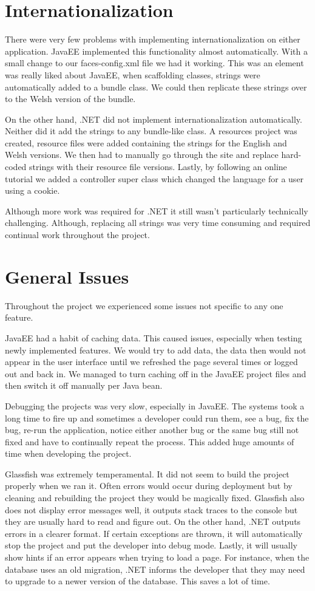 \section{Internationalization}
There were very few problems with implementing internationalization on either application. JavaEE implemented this functionality almost automatically. With a small change to our faces-config.xml file we had it working. This was an element was really liked about JavaEE, when scaffolding classes, strings were automatically added to a bundle class. We could then replicate these strings over to the Welsh version of the bundle. \par
On the other hand, .NET did not implement internationalization automatically. Neither did it add the strings to any bundle-like class. A resources project was created, resource files were added containing the strings for the English and Welsh versions. We then had to manually go through the site and replace hard-coded strings with their resource file versions. Lastly, by following an online tutorial\cite{mvci18ntutorial} we added a controller super class which changed the language for a user using a cookie. \par
Although more work was required for .NET it still wasn’t particularly technically challenging. Although, replacing all strings was very time consuming and required continual work throughout the project.
\section {General Issues}
Throughout the project we experienced some issues not specific to any one feature. \par
JavaEE had a habit of caching data. This caused issues, especially when testing newly implemented features. We would try to add data, the data then would not appear in the user interface until we refreshed the page several times or logged out and back in. We managed to turn caching off in the JavaEE project files and then switch it off manually per Java bean. \par
Debugging the projects was very slow, especially in JavaEE. The systems took a long time to fire up and sometimes a developer could run them, see a bug, fix the bug, re-run the application, notice either another bug or the same bug still not fixed and have to continually repeat the process. This added huge amounts of time when developing the project. \par
Glassfish was extremely temperamental. It did not seem to build the project properly when we ran it. Often errors would occur during deployment but by cleaning and rebuilding the project they would be magically fixed. Glassfish also does not display error messages well, it outputs stack traces to the console but they are usually hard to read and figure out. On the other hand, .NET outputs errors in a clearer format. If certain exceptions are thrown, it will automatically stop the project and put the developer into debug mode. Lastly, it will usually show hints if an error appears when trying to load a page. For instance, when the database uses an old migration, .NET informs the developer that they may need to upgrade to a newer version of the database. This saves a lot of time.

